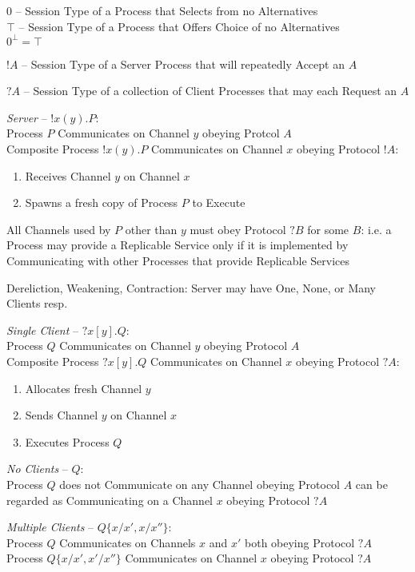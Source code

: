 $0$ -- Session Type of a Process that Selects from no Alternatives \\
$\top$ -- Session Type of a Process that Offers Choice of no
Alternatives \\
$0^\bot = \top$


$!A$ -- Session Type of a Server Process that will repeatedly Accept an
$A$

$?A$ -- Session Type of a collection of Client Processes that may each
Request an $A$

\emph{Server} -- $!x(y).P$: \\
Process $P$ Communicates on Channel $y$ obeying Protcol $A$ \\
Composite Process $!x(y).P$ Communicates on Channel $x$ obeying
Protocol $!A$:
\begin{enumerate}
  \item Receives Channel $y$ on Channel $x$
  \item Spawns a fresh copy of Process $P$ to Execute
\end{enumerate}
All Channels used by $P$ other than $y$ must obey Protocol $?B$ for
some $B$: i.e. a Process may provide a Replicable Service only if it
is implemented by Communicating with other Processes that provide
Replicable Services

Dereliction, Weakening, Contraction: Server may have One, None, or
Many Clients resp.

\emph{Single Client} -- $?x[y].Q$: \\
Process $Q$ Communicates on Channel $y$ obeying Protocol $A$ \\
Composite Process $?x[y].Q$ Communicates on Channel $x$ obeying
Protocol $?A$:
\begin{enumerate}
  \item Allocates fresh Channel $y$
  \item Sends Channel $y$ on Channel $x$
  \item Executes Process $Q$
\end{enumerate}

\emph{No Clients} -- $Q$: \\
Process $Q$ does not Communicate on any Channel obeying Protocol $A$
can be regarded as Communicating on a Channel $x$ obeying Protocol
$?A$

\emph{Multiple Clients} -- $Q\{x/x',x/x''\}$: \\
Process $Q$ Communicates on Channels $x$ and $x'$ both obeying
Protocol $?A$ \\
Process $Q\{x/x',x'/x''\}$ Communicates on Channel $x$ obeying
Protocol $?A$


